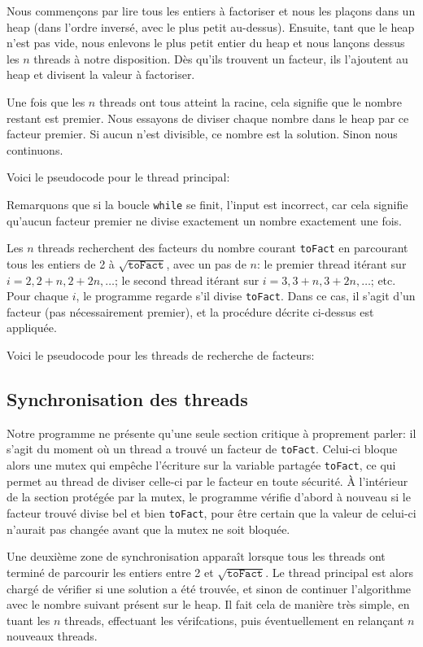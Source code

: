 \documentclass[a4paper,10pt]{article}
\begin{document}
Nous commençons par lire tous les entiers à factoriser et nous les plaçons dans un heap (dans l'ordre inversé, avec le plus petit au-dessus). Ensuite, tant que le heap n'est pas vide, nous enlevons le plus petit entier du heap et nous lançons dessus les $n$ threads à notre disposition. Dès qu'ils trouvent un facteur, ils l'ajoutent au heap et divisent la valeur à factoriser.

Une fois que les $n$ threads ont tous atteint la racine, cela signifie que le nombre restant est premier. Nous essayons de diviser chaque nombre dans le heap par ce facteur premier. Si aucun n'est divisible, ce nombre est la solution. Sinon nous continuons.

Voici le pseudocode pour le thread principal:



Remarquons que si la boucle \texttt{while} se finit, l'input est incorrect, car cela signifie qu'aucun facteur premier ne divise exactement un nombre exactement une fois.

Les $n$ threads recherchent des facteurs du nombre courant \texttt{toFact} en parcourant tous les entiers de 2 à $\sqrt{\texttt{toFact}}$, avec un pas de $n$: le premier thread itérant sur $i=2,2+n,2+2n,\dots$; le second thread itérant sur $i=3,3+n,3+2n,\dots$; etc. Pour chaque $i$, le programme regarde s'il divise \texttt{toFact}. Dans ce cas, il s'agit d'un facteur (pas nécessairement premier), et la procédure décrite ci-dessus est appliquée.

Voici le pseudocode pour les threads de recherche de facteurs:



\subsection*{Synchronisation des threads}

Notre programme ne présente qu'une seule section critique à proprement parler: il s'agit du moment où un thread a trouvé un facteur de \texttt{toFact}. Celui-ci bloque alors une mutex qui empêche l'écriture sur la variable partagée \texttt{toFact}, ce qui permet au thread de diviser celle-ci par le facteur en toute sécurité. À l'intérieur de la section protégée par la mutex, le programme vérifie d'abord à nouveau si le facteur trouvé divise bel et bien \texttt{toFact}, pour être certain que la valeur de celui-ci n'aurait pas changée avant que la mutex ne soit bloquée.

Une deuxième zone de synchronisation apparaît lorsque tous les threads ont terminé de parcourir les entiers entre 2 et $\sqrt{\texttt{toFact}}$. Le thread principal est alors chargé de vérifier si une solution a été trouvée, et sinon de continuer l'algorithme avec le nombre suivant présent sur le heap. Il fait cela de manière très simple, en tuant les $n$ threads, effectuant les vérifcations, puis éventuellement en relançant $n$ nouveaux threads.
\end{document}
